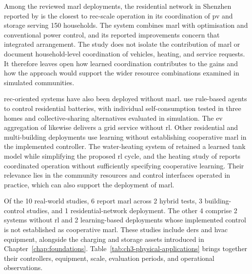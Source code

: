 Among the reviewed \gls{marl} deployments, the residential network in Shenzhen reported by \textcite{recP01} is the closest to \gls{rec}-scale operation in its coordination of \gls{pv} and storage serving 150 households. The system combines \gls{marl} with optimisation and conventional power control, and its reported improvements concern that integrated arrangement. The study does not isolate the contribution of \gls{marl} or document household-level coordination of vehicles, heating, and service requests. It therefore leaves open how learned coordination contributes to the gains and how the approach would support the wider resource combinations examined in simulated communities.

\gls{rec}-oriented systems have also been deployed without \gls{marl}. \textcite{patricio2026recmas} use rule-based agents to control residential batteries, with individual self-consumption tested in three homes and collective-sharing alternatives evaluated in simulation. The \gls{ev} aggregation of \textcite{recN08} likewise delivers a grid service without \gls{rl}. Other residential and multi-building deployments use learning without establishing cooperative \gls{marl} in the implemented controller. The water-heating system of \textcite{recP02} retained a learned tank model while simplifying the proposed \gls{rl} cycle, and the heating study of \textcite{recP10} reports coordinated operation without sufficiently specifying cooperative learning. Their relevance lies in the community resources and control interfaces operated in practice, which can also support the deployment of \gls{marl}.


Of the 10 real-world studies, 6 report \gls{marl} across 2 hybrid tests, 3 building-control studies, and 1 residential-network deployment. The other 4 comprise 2 systems without \gls{rl} and 2 learning-based deployments whose implemented control is not established as cooperative \gls{marl}. These studies include \glspl{der} and \gls{hvac} equipment, alongside the charging and storage assets introduced in Chapter~\ref{chap:foundations}. Table~\ref{tab:ch3-physical-applications} brings together their controllers, equipment, scale, evaluation periods, and operational observations.

